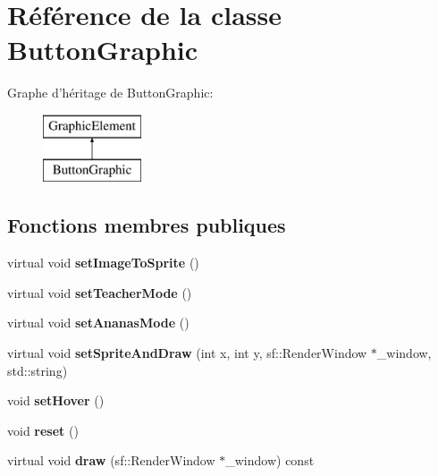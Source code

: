 \hypertarget{class_button_graphic}{\section{Référence de la classe Button\-Graphic}
\label{class_button_graphic}
}
Graphe d'héritage de Button\-Graphic\-:\begin{figure}[H]
\begin{center}
\leavevmode
\includegraphics[height=2.000000cm]{class_button_graphic}
\end{center}
\end{figure}
\subsection*{Fonctions membres publiques}
\begin{DoxyCompactItemize}
\item 
\hypertarget{class_button_graphic_a4d34450a0f45dfc3569e3519de72eced}{virtual void {\bfseries set\-Image\-To\-Sprite} ()}\label{class_button_graphic_a4d34450a0f45dfc3569e3519de72eced}

\item 
\hypertarget{class_button_graphic_a2aaf45618764fd342fe39646d24a2c75}{virtual void {\bfseries set\-Teacher\-Mode} ()}\label{class_button_graphic_a2aaf45618764fd342fe39646d24a2c75}

\item 
\hypertarget{class_button_graphic_a087503d732dded5b8006c48c9047b736}{virtual void {\bfseries set\-Ananas\-Mode} ()}\label{class_button_graphic_a087503d732dded5b8006c48c9047b736}

\item 
\hypertarget{class_button_graphic_a8e406b9618765edc7b1f9ee7568c0def}{virtual void {\bfseries set\-Sprite\-And\-Draw} (int x, int y, sf\-::\-Render\-Window $\ast$\-\_\-window, std\-::string)}\label{class_button_graphic_a8e406b9618765edc7b1f9ee7568c0def}

\item 
\hypertarget{class_button_graphic_a2fed2c1bf6dc330998497efbf4347b87}{void {\bfseries set\-Hover} ()}\label{class_button_graphic_a2fed2c1bf6dc330998497efbf4347b87}

\item 
\hypertarget{class_button_graphic_a85728fbd0bad0617622398c1328037fc}{void {\bfseries reset} ()}\label{class_button_graphic_a85728fbd0bad0617622398c1328037fc}

\item 
\hypertarget{class_button_graphic_a19b792938f2ee0b681a8f73d3119e726}{virtual void {\bfseries draw} (sf\-::\-Render\-Window $\ast$\-\_\-window) const }\label{class_button_graphic_a19b792938f2ee0b681a8f73d3119e726}

\end{DoxyCompactItemize}
